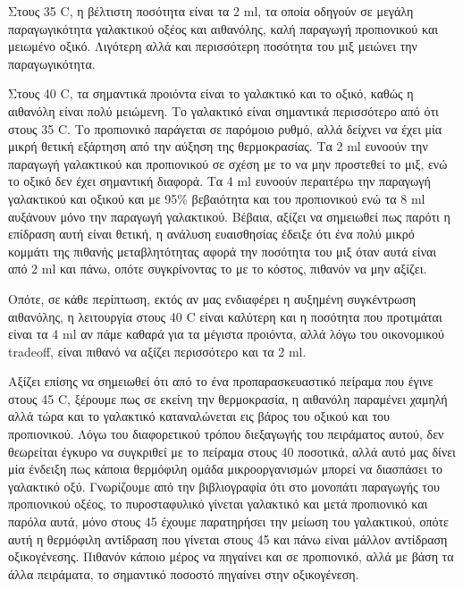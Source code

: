 \documentclass[11pt]{article}
\begin{document}
Στους 35 C, η βέλτιστη ποσότητα είναι τα 2 ml, τα οποία οδηγούν σε μεγάλη παραγωγικότητα γαλακτικού οξέος και αιθανόλης, καλή παραγωγή προπιονικού και μειωμένο οξικό. Λιγότερη αλλά και περισσότερη ποσότητα του μιξ μειώνει την παραγωγικότητα.

Στους 40 C, τα σημαντικά προιόντα είναι το γαλακτικό και το οξικό, καθώς η αιθανόλη είναι πολύ μειώμενη. Το γαλακτικό είναι σημαντικά περισσότερο από ότι στους 35 C. Το προπιονικό παράγεται σε παρόμοιο ρυθμό, αλλά δείχνει να έχει μία μικρή θετική εξάρτηση από την αύξηση της θερμοκρασίας. Τα 2 ml ευνοούν την παραγωγή γαλακτικού και προπιονικού σε σχέση με το να μην προστεθεί το μιξ, ενώ το οξικό δεν έχει σημαντική διαφορά. Τα 4 ml ευνοούν περαιτέρω την παραγωγή γαλακτικού και οξικού και με 95\% βεβαιότητα και του προπιονικού ενώ τα 8 ml αυξάνουν μόνο την παραγωγή γαλακτικού. Βέβαια, αξίζει να σημειωθεί πως παρότι η επίδραση αυτή είναι θετική, η ανάλυση ευαισθησίας έδειξε ότι ένα πολύ μικρό κομμάτι της πιθανής μεταβλητότητας αφορά την ποσότητα του μιξ όταν αυτά είναι από 2 ml και πάνω, οπότε συγκρίνοντας το με το κόστος, πιθανόν να μην αξίζει.

Οπότε, σε κάθε περίπτωση, εκτός αν μας ενδιαφέρει η αυξημένη συγκέντρωση αιθανόλης, η λειτουργία στους 40 C είναι καλύτερη και η ποσότητα που προτιμάται είναι τα 4 ml αν πάμε καθαρά για τα μέγιστα προιόντα, αλλά λόγω του οικονομικού tradeoff, είναι πιθανό να αξίζει περισσότερο και τα 2 ml.

Αξίζει επίσης να σημειωθεί ότι από το ένα προπαρασκευαστικό πείραμα που έγινε στους 45 C, ξέρουμε πως σε εκείνη την θερμοκρασία, η αιθανόλη παραμένει χαμηλή αλλά τώρα και το γαλακτικό καταναλώνεται εις βάρος του οξικού και του προπιονικού. Λόγω του διαφορετικού τρόπου διεξαγωγής του πειράματος αυτού, δεν θεωρείται έγκυρο να συγκριθεί με το πείραμα στους 40 ποσοτικά, αλλά αυτό μας δίνει μία ένδειξη πως κάποια θερμόφιλη ομάδα μικροοργανισμών μπορεί να διασπάσει το γαλακτικό οξύ. Γνωρίζουμε από την βιβλιογραφία ότι στο μονοπάτι παραγωγής του προπιονικού οξέος, το πυροσταφυλικό γίνεται γαλακτικό και μετά προπιονικό και παρόλα αυτά, μόνο στους 45 έχουμε παρατηρήσει την μείωση του γαλακτικού, οπότε αυτή η θερμόφιλη αντίδραση που γίνεται στους 45 και πάνω είναι μάλλον αντίδραση οξικογένεσης. Πιθανόν κάποιο μέρος να πηγαίνει και σε προπιονικό, αλλά με βάση τα άλλα πειράματα, το σημαντικό ποσοστό πηγαίνει στην οξικογένεση.
\end{document}
